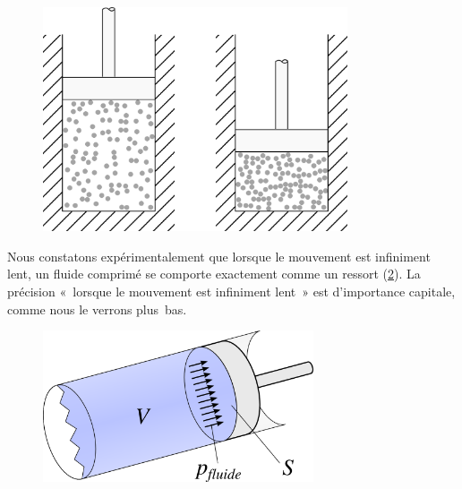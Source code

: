 		\begin{figure}
			\begin{center}
			\includegraphics[width=9cm]{images/particules_compression_lente.png}
			\end{center}
			\label{fig_molécules_compression_lente}
		\end{figure}

		Nous constatons expérimentalement que lorsque le mouvement est infiniment lent, un fluide comprimé se comporte exactement comme un ressort (\cref{fig_piston_fluide_lent}). La précision «~lorsque le mouvement est infiniment lent~» est d’importance capitale, comme nous le verrons plus~bas.

		\begin{figure}
			\begin{center}
			\includegraphics[width=8cm]{images/travail_cylindre_2.png}
			\end{center}
			\label{fig_piston_fluide_lent}
		\end{figure}

